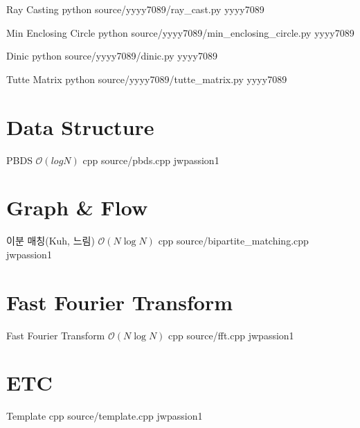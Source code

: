 \documentclass[landscape, 10pt, a4paper, oneside, twocolumn]{extarticle}
\begin{document}
\Algorithm
{Ray Casting}
{}
{}
{python}
{source/yyyy7089/ray_cast.py}
{yyyy7089}

\Algorithm
{Min Enclosing Circle}
{}
{}
{python}
{source/yyyy7089/min_enclosing_circle.py}
{yyyy7089}

\Algorithm
{Dinic}
{}
{}
{python}
{source/yyyy7089/dinic.py}
{yyyy7089}

\Algorithm
{Tutte Matrix}
{}
{}
{python}
{source/yyyy7089/tutte_matrix.py}
{yyyy7089}


\section{Data Structure}

\Algorithm
{PBDS}
{}
{$\mathcal{O}(log{N})$}
{cpp}
{source/pbds.cpp}
{jwpassion1}


\section{Graph \& Flow}

\Algorithm
{이분 매칭(Kuh, 느림)}
{}
{$\mathcal{O}(N\log{N})$}
{cpp}
{source/bipartite_matching.cpp}
{jwpassion1}


\section{Fast Fourier Transform}

\Algorithm
{Fast Fourier Transform}
{}
{$\mathcal{O}(N\log{N})$}
{cpp}
{source/fft.cpp}
{jwpassion1}


\section{ETC}

\Algorithm
{Template}
{}
{}
{cpp}
{source/template.cpp}
{jwpassion1}

\end{document}
